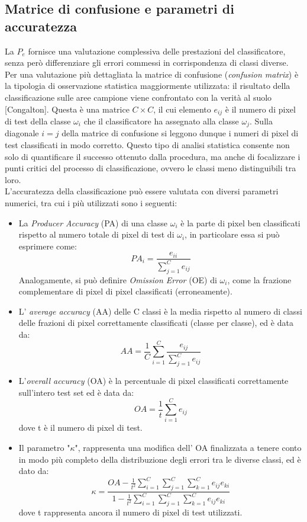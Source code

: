 \subsection{Matrice di confusione e parametri di accuratezza}
La $P_e$ fornisce una valutazione complessiva delle prestazioni del classificatore, senza però differenziare gli errori commessi in corrispondenza di classi diverse. Per una valutazione più dettagliata la matrice di confusione (\emph{confusion matrix}) è la tipologia di osservazione statistica maggiormente utilizzata: il risultato della classificazione sulle aree campione viene confrontato con la verità al suolo [Congalton]. Questa è una matrice $C \times C$, il cui elemento $e_{ij}$ è il numero di pixel di test della classe $\omega_i$ che il classificatore ha assegnato alla classe $\omega_j$. Sulla diagonale $i=j$ della matrice di confusione si leggono dunque i numeri di pixel di test classificati in modo corretto. Questo tipo di analisi statistica consente non solo di quantificare il successo ottenuto dalla procedura, ma anche di focalizzare i punti critici del processo di classificazione, ovvero le classi meno distinguibili tra loro. \\
L'accuratezza della classificazione può essere valutata con diversi parametri numerici, tra cui i più utilizzati sono i seguenti:
\begin{itemize}
\item La \emph{Producer Accuracy} (PA) di una classe $\omega_i$ è la
parte di pixel ben classificati rispetto al numero totale di
pixel di test di $\omega_i$, in particolare essa si può esprimere
come:
\begin{equation}
\label{eq:PA}
PA_i=\dfrac{e_{ii}}{\sum_{j=1}^Ce_{ij}}
\end{equation}
Analogamente, si può definire \emph{Omission Error} (OE) di $\omega_i$, come la frazione complementare di pixel di pixel classificati (erroneamente).
\item L' \emph{average accuracy} (AA) delle C classi è la media rispetto al numero di classi delle frazioni di pixel correttamente classificati (classe per classe), ed è data da:
\begin{equation}
\label{eq:AA}
AA=\dfrac{1}{C}\sum_{i=1}^C\dfrac{e_{ij}}{\sum_{j=1}^C e_{ij}}
\end{equation}
\item L'\emph{overall accuracy }(OA) è la percentuale di pixel classificati correttamente sull'intero test set ed è data da:
\begin{equation}
\label{eq:OA}
OA= \dfrac{1}{t}\sum_{i=1}^C e_{ij}
\end{equation}
dove t è il numero di pixel di test.
\item Il parametro "$\kappa$", rappresenta una modifica dell' OA finalizzata a tenere conto in modo più completo della distribuzione degli errori tra le diverse classi, ed è dato da:
\begin{equation}
\label{eq:K}
\kappa=\dfrac{OA-\frac{1}{t^2}\sum_{i=1}^C\sum_{j=1}^C\sum_{k=1}^C e_{ij}e_{ki}}{1-\frac{1}{t^2}\sum_{i=1}^C\sum_{j=1}^C\sum_{k=1}^C e_{ij} e_{ki}}
\end{equation}
dove t rappresenta ancora il numero di pixel di test utilizzati.
\end{itemize}


